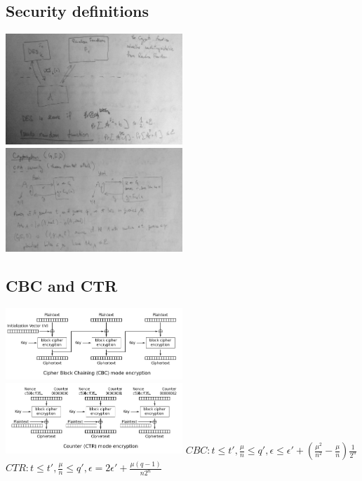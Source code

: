 \documentclass[a4paper,10pt]{article}
\begin{document}
\subsection*{Security definitions}
\includegraphics[width=0.5\textwidth]{PRF_security.jpg}
\includegraphics[width=0.5\textwidth]{CPA_security.jpg}
\subsection*{CBC and CTR}
\includegraphics[width=0.5\textwidth]{CBC.png}
\includegraphics[width=0.5\textwidth]{CTR.png}
$
CBC:
t \leq t', \frac{\mu}{n} \leq q', \epsilon \leq \epsilon' + \left( \frac{\mu^2}{n^2}-\frac{\mu}{n}\right) \frac{1}{2^n}
$\\
$
CTR:
t \leq t', \frac{\mu}{n} \leq q', \epsilon = 2\epsilon' + \frac{\mu(q-1)}{n2^n}
$
\end{document}
